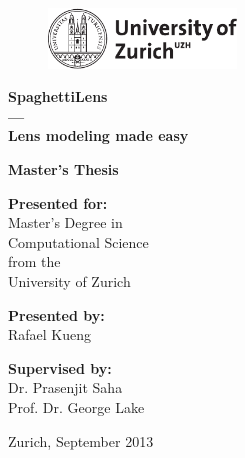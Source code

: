 \begin{figure}[th]
		\includegraphics[width=5cm]{pic/uzh}
	\label{fig:logo}
\end{figure}

\begin{center}

\vspace{1cm}


{\Huge\bf SpaghettiLens\\}
\vspace{0.5cm}
{\Huge\bf ---\\}
\vspace{0.5cm}
{\Huge\bf Lens modeling made easy}

\vspace{3cm}

{\Large\bf Master's Thesis}

\vspace{1cm}

{\Large\bf Presented for:\\}
{\Large Master's Degree in\\}
{\Large Computational Science\\}
{\Large from the\\}
{\Large University of Zurich\\}

\vspace{1cm}

{\Large\bf Presented by:\\}
{\Large Rafael Kueng\\}

\vspace{1cm}

{\Large\bf Supervised by:\\}
{\Large Dr. Prasenjit Saha\\}
{\Large Prof. Dr. George Lake\\}


\vspace{1cm}

{\Large Zurich, September 2013} 

\end{center}
\newpage
